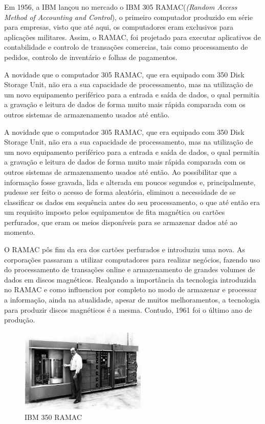 \documentclass{report}
\begin{document}
		Em 1956, a IBM lançou no mercado o IBM 305 RAMAC(\textit{(Random Access Method of Accounting and Control}), o primeiro computador produzido em série para empresas, visto que até aqui, os computadores eram exclusivos para aplicações militares. Assim, o RAMAC, foi projetado para executar aplicativos de contabilidade e controlo de transações comercias, tais como processamento de pedidos, controlo de inventário e folhas de pagamentos.
\vspace{1mm}

		A novidade que o computador 305 RAMAC, que era equipado com 350 Disk Storage Unit, não era a sua capacidade de processamento, mas na utilização de um novo equipamento periférico para a entrada e saída de dados, o qual permitia a gravação e leitura de dados de forma muito mais rápida comparada com os outros sistemas de armazenamento usados até então.
\vspace{1mm}
		
		A novidade que o computador 305 RAMAC, que era equipado com 350 Disk Storage Unit, não era a sua capacidade de processamento, mas na utilização de um novo equipamento periférico para a entrada e saída de dados, o qual permitia a gravação e leitura de dados de forma muito mais rápida comparada com os outros sistemas de armazenamento usados até então. Ao possibilitar que a informação fosse gravada, lida e alterada em poucos segundos e, principalmente, pudesse ser feito o acesso de forma aleatória, eliminou a necessidade de se classificar os dados em sequência antes do seu processamento, o que até então era um requisito imposto pelos equipamentos de fita magnética ou cartões perfurados, que eram os meios disponíveis para se armazenar dados até ao momento.
\vspace{1mm}

		 O RAMAC pôs fim da era dos cartões perfurados e introduziu uma nova. As corporações passaram a utilizar computadores para realizar negócios, fazendo uso do processamento de transações online e armazenamento de grandes volumes de dados em discos magnéticos. Realçando a importância da tecnologia introduzida no RAMAC e como influenciou por completo no modo de armazenar e processar a informação, ainda na atualidade, apesar de muitos melhoramentos, a tecnologia para produzir discos magnéticos é a mesma. Contudo, 1961 foi o último ano de produção.

	\begin{figure} [h]
		\centering
		\includegraphics[width=6cm, height=4cm]	{RAMAC.jpg}
		\caption{IBM 350 RAMAC}
	\end{figure}
	
\end{document}
